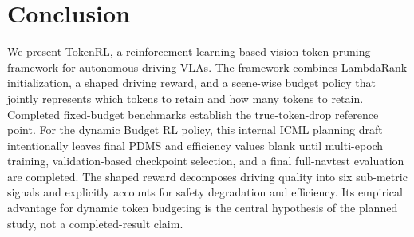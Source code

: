 \documentclass[letterpaper]{article} %
\newcommand{\ours}{TokenRL}
\begin{document}
\section{Conclusion}
\label{sec:conclusion}

We present \ours{}, a reinforcement-learning-based vision-token pruning framework for autonomous driving VLAs. The framework combines LambdaRank initialization, a shaped driving reward, and a scene-wise budget policy that jointly represents which tokens to retain and how many tokens to retain.
Completed fixed-budget benchmarks establish the true-token-drop reference point. For the dynamic Budget RL policy, this internal ICML planning draft intentionally leaves final PDMS and efficiency values blank until multi-epoch training, validation-based checkpoint selection, and a final full-navtest evaluation are completed.
The shaped reward decomposes driving quality into six sub-metric signals and explicitly accounts for safety degradation and efficiency. Its empirical advantage for dynamic token budgeting is the central hypothesis of the planned study, not a completed-result claim.


\end{document}
